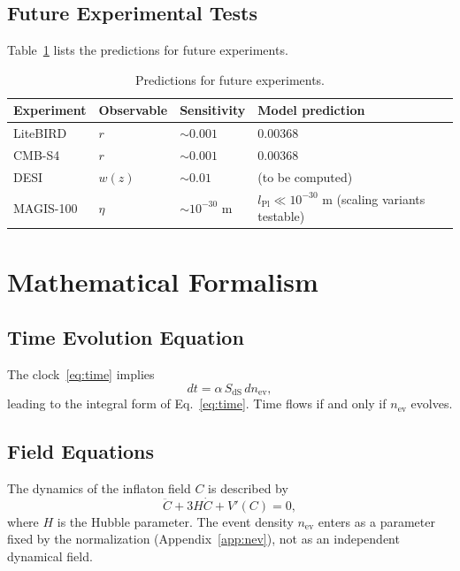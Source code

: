 \documentclass[11pt,a4paper]{article}
\begin{document}
\subsection{Future Experimental Tests}
Table~\ref{tab:future} lists the predictions for future
experiments.

\begin{table}[h]
\centering
\caption{Predictions for future experiments.}
\label{tab:future}
\begin{tabular}{llll}
\toprule
Experiment & Observable & Sensitivity & Model prediction\\
\midrule
LiteBIRD & $r$ & $\sim0.001$ & 0.00368\\
CMB-S4 & $r$ & $\sim0.001$ & 0.00368\\
DESI & $w(z)$ & $\sim0.01$ & (to be computed)\\
MAGIS-100 & $\eta$ & $\sim10^{-30}$ m &
$l_{\mathrm{Pl}}\ll10^{-30}$ m (scaling variants testable)\\
\bottomrule
\end{tabular}
\end{table}

\section{Mathematical Formalism}
\subsection{Time Evolution Equation}
The clock~\eqref{eq:time} implies
\begin{equation}
dt=\alpha\, S_{\mathrm{dS}}\, dn_{\mathrm{ev}},
\end{equation}
leading to the integral form of Eq.~\eqref{eq:time}. Time flows if
and only if $n_{\mathrm{ev}}$ evolves.

\subsection{Field Equations}
The dynamics of the inflaton field $C$ is described by
\begin{equation}
\ddot{C}+3H\dot{C}+V'(C)=0,
\end{equation}
where $H$ is the Hubble parameter. The event density
$n_{\mathrm{ev}}$ enters as a parameter fixed by the normalization
(Appendix~\ref{app:nev}), not as an independent dynamical field.
\end{document}
